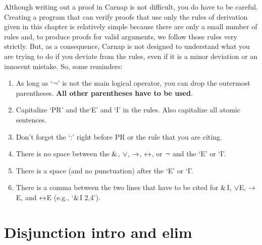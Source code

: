 Although writing out a proof in Carnap is not difficult, you do have to be careful. Creating a program that can verify proofs that use only the rules of derivation given in this chapter is relatively simple because there are only a small number of rules and, to produce proofs for valid arguments, we follow those rules very strictly. But, as a consequence, Carnap is not designed to understand what you are trying to do if you deviate from the rules, even if it is a minor deviation or an innocent mistake. So, some reminders:
\begin{enumerate}
\itemsep-.6mm
	\item As long as `${\neg}$' is not the main logical operator, you can drop the outermost parentheses. \textbf{All other parentheses have to be used}. 
	\item Capitalize `PR' and the`E' and `I' in the rules. Also capitalize all atomic sentences.
	\item Don't forget the `:' right before PR or the rule that you are citing. 
	\item There is no space between the $\mathbin{\&}$, $\vee$, $\rightarrow$, $\leftrightarrow$, or ${\neg}$ and the `E' or `I'.  
	\item There is a space (and no punctuation) after the `E' or `I'. 
	\item There is a comma between the two lines that have to be cited for $\mathbin{\&}$I, $\vee$E, $\rightarrow$E, and $\leftrightarrow$E (e.g., `$\mathbin{\&}$I 2,4').
\end{enumerate}
 
 

\section{Disjunction intro and elim}\label{s:disj-rule}


